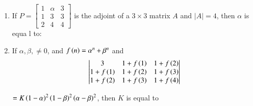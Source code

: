 \documentclass[journal,12pt,twocolumn]{IEEEtran}
\theoremstyle{remark}
\begin{document}
\begin{enumerate}
	\item If $P = \begin{bmatrix}1&\alpha&3\\1&3&3\\2&4&4\end{bmatrix}$ is the adjoint of a $3\times3$ matrix $A$ and $|A| = 4$, then $\alpha$ is equa l to:
	\hfill{}
        \begin{enumerate}[label={(\alph*)}]
        \end{enumerate}

	\item If $\alpha,\beta,\neq 0$, and $f\left(n\right) = \alpha^n + \beta^n$ and
		\newline
		\begin{align*}
			\begin{vmatrix}
				3 & 1+f\left(1\right) & 1+f\left(2\right)\\
				1+f\left(1\right) & 1+f\left(2\right) & 1+f\left(3\right)\\
				1+f\left(2\right) & 1+f\left(3\right) & 1+f\left(4\right)
			\end{vmatrix}
		\end{align*}

		$=K\left(1-\alpha\right)^2\left(1-\beta\right)^2\left(\alpha-\beta\right)^2$,
		then $K$ is equal to

	\hfill{}
        \begin{enumerate}[label={(\alph*)}]
        \end{enumerate}



\end{enumerate}
\end{document}
